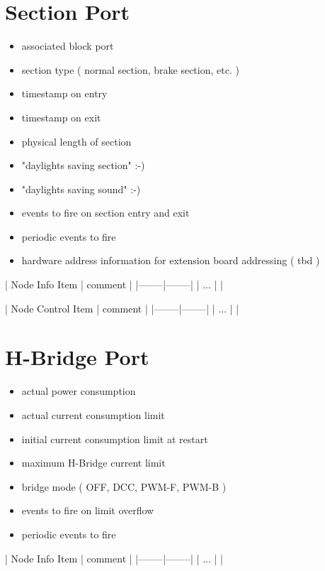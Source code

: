 \section{Section Port}

\begin{itemize}
\begin{itemize}
\item associated block port
\item section type ( normal section, brake section, etc. )
\item timestamp on entry
\item timestamp on exit
\item physical length of section
\item "daylights saving section" :-)
\item "daylights saving sound" :-)
\item events to fire on section entry and exit
\item periodic events to fire
\item hardware address information for extension board addressing ( tbd )
\end{itemize}
\end{itemize}

| Node Info Item | comment |
|--------|--------|
| ... | |

| Node Control Item | comment |
|--------|--------|
| ... | |

\section{H-Bridge Port}

\begin{itemize}
\begin{itemize}
\item actual power consumption
\item actual current consumption limit
\item initial current consumption limit at restart
\item maximum H-Bridge current limit
\item bridge mode ( OFF, DCC, PWM-F, PWM-B )
\item events to fire on limit overflow
\item periodic events to fire
\end{itemize}
\end{itemize}

| Node Info Item | comment |
|--------|--------|
| ... | |

